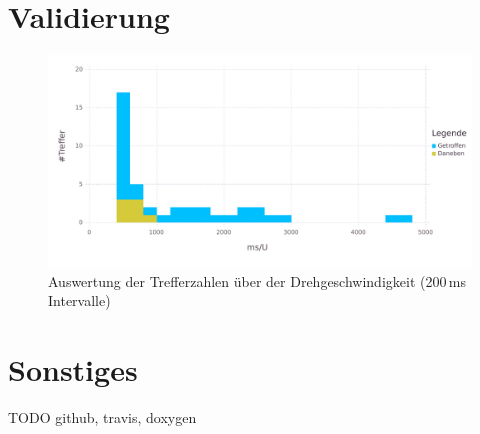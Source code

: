 
\section{Validierung}
\begin{figure}[hb] \centering
	\includegraphics[width=\textwidth]{images/auswertung.pdf}
	\caption{Auswertung der Trefferzahlen über der Drehgeschwindigkeit (200\,ms Intervalle)}
	\label{img:auswertungsplot}
\end{figure}

\section{Sonstiges}
TODO github, travis, doxygen